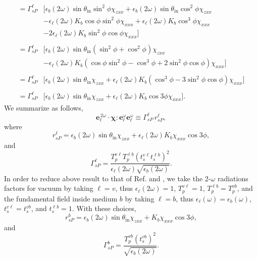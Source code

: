 \begin{equation*}
\begin{split}
= \Gamma^{\ell}_{sP}
&\big[
   \epsilon_{b}(2\omega)\sin\theta_{\mathrm{in}}\sin^{2}\phi\chi_{zxx}
 + \epsilon_{b}(2\omega)\sin\theta_{\mathrm{in}}\cos^{2}\phi\chi_{zxx}\\
&- \epsilon_{\ell}(2\omega)K_{b}\cos\phi\sin^{2}\phi\chi_{xxx}
 + \epsilon_{\ell}(2\omega)K_{b}\cos^{3}\phi\chi_{xxx}\\
&- 2\epsilon_{\ell}(2\omega)K_{b}\sin^{2}\phi\cos\phi\chi_{xxx}
\big]\\\\
= \Gamma^{\ell}_{sP}
&\big[
\epsilon_{b}(2\omega)\sin\theta_{\mathrm{in}}
(\sin^{2}\phi + \cos^{2}\phi)\chi_{zxx}\\
&- \epsilon_{\ell}(2\omega)K_{b}
(\cos\phi\sin^{2}\phi - \cos^{3}\phi + 2\sin^{2}\phi\cos\phi)\chi_{xxx}
\big]\\\\
= \Gamma^{\ell}_{sP}
&\big[
  \epsilon_{b}(2\omega)\sin\theta_{\mathrm{in}}\chi_{zxx} 
+ \epsilon_{\ell}(2\omega)K_{b}(\cos^{3}\phi - 3\sin^{2}\phi\cos\phi)\chi_{xxx}
\big]\\\\
= \Gamma^{\ell}_{sP}
&\big[
  \epsilon_{b}(2\omega)\sin\theta_{\mathrm{in}}\chi_{zxx}
+ \epsilon_{\ell}(2\omega)K_{b}\cos3\phi\chi_{xxx}
\big].
\end{split}
\end{equation*}
We summarize as follows,
\begin{equation*}
\mathbf{e}^{\,2\omega}_{\ell}\cdot
\boldsymbol{\chi}:\mathbf{e}^\omega_{\ell}\mathbf{e}^\omega_{\ell}
\equiv\Gamma^{\ell}_{sP}\, r^{\ell}_{sP},
\end{equation*}
where
\begin{equation*}
r^{\ell}_{sP}
= \epsilon_{b}(2\omega)\sin\theta_{\mathrm{in}}\chi_{zxx}
+ \epsilon_{\ell}(2\omega)K_{b}\chi_{xxx}\cos3\phi,
\end{equation*} 
and  
\begin{equation*}
\Gamma^{\ell}_{sP}=
\frac{T_{p}^{v\ell}T^{\ell b}_{p}\left(t_s^{v\ell}t^{\ell b}_s\right)^2}
     {\epsilon_{\ell}(2\omega)\sqrt{\epsilon_{b}(2\omega)}}.  
\end{equation*} 
In order to reduce above result to that of Ref. \cite{mizrahiJOSA88} and
\cite{sipePRB87},  we take the 2-$\omega$ radiations factors for vacuum by
taking $\ell=v$, thus $\epsilon_{\ell}(2\omega)=1$, $T^{v\ell}_{p}=1$,
$T^{\ell b}_{p}=T^{vb}_{p}$, and the fundamental field inside medium $b$ by
taking $\ell=b$, thus $\epsilon_{\ell}(\omega)=\epsilon_{b}(\omega)$,
$t^{v\ell}_s=t^{vb}_s$, and $t^{\ell b}_s=1$. With these choices,
\begin{equation*}
r^{b}_{sP} = \epsilon_{b}(2\omega)\sin\theta_{\mathrm{in}}\chi_{zxx}
+ K_{b}\chi_{xxx}\cos3\phi,
\end{equation*} 
and 
\begin{equation*}
\Gamma^{b}_{sP} =
\frac{T^{v b}_{p}(t_s^{vb})^{2}}{\sqrt{\epsilon_{b}(2\omega)}}.  
\end{equation*} 


